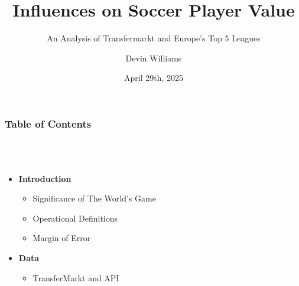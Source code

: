 \documentclass[t,aspectratio=169,xcolor=dvipsnames]{beamer}
\begin{document}
\title[short title]{Influences on Soccer Player Value} 
\subtitle{An Analysis of Transfermarkt and Europe's Top 5 Leagues}

\author{Devin Williams}

\date{{April 29th, 2025}}

\begin{frame}[plain]
    \titlepage
\end{frame}

\begin{frame}[plain]
    \frametitle{Table of Contents} 
    \framesubtitle{~}
\vspace{0.5cm}
    \begin{columns}[T]
        \begin{column}{0.48\textwidth}
            \begin{itemize}
                \item[\faInfoCircle] \textbf{Introduction}
                \begin{itemize}
                    \item Significance of The World's Game
                    \item Operational Definitions
                    \item Margin of Error
                \end{itemize}
                
                \item[\faDatabase] \textbf{Data}
                \begin{itemize}
                    \item TransferMarkt and API
                \end{itemize}
            \end{itemize}
        \end{column}
        

\end{columns}
\end{frame}
\end{document}

